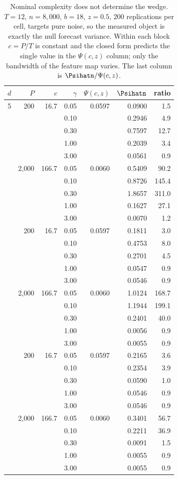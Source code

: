 \begin{table}[htbp]
\centering
\caption{Nominal complexity does not determine the wedge. $T=12$, $n=8{,}000$, $b=18$, $z=0.5$, $200$ replications per cell, targets pure noise, so the measured object is exactly the null forecast variance. Within each block $c=P/T$ is constant and the closed form predicts the single value in the $\Psi(c,z)$ column; only the bandwidth of the feature map varies. The last column is $\Psihatn/\Psi(c,z)$.}
\label{tab:mc-features}
\small
\begin{tabular}{rrrrrrr}
\toprule
$d$ & $P$ & $c$ & $\gamma$ & $\Psi(c,z)$ & $\Psihatn$ & ratio \\
\midrule
5 & 200 & 16.7 & 0.05 & 0.0597 & 0.0900 & 1.5 \\
 &  &  & 0.10 &  & 0.2946 & 4.9 \\
 &  &  & 0.30 &  & 0.7597 & 12.7 \\
 &  &  & 1.00 &  & 0.2039 & 3.4 \\
 &  &  & 3.00 &  & 0.0561 & 0.9 \\
\addlinespace
5 & 2,000 & 166.7 & 0.05 & 0.0060 & 0.5409 & 90.2 \\
 &  &  & 0.10 &  & 0.8726 & 145.4 \\
 &  &  & 0.30 &  & 1.8657 & 311.0 \\
 &  &  & 1.00 &  & 0.1627 & 27.1 \\
 &  &  & 3.00 &  & 0.0070 & 1.2 \\
\addlinespace
15 & 200 & 16.7 & 0.05 & 0.0597 & 0.1811 & 3.0 \\
 &  &  & 0.10 &  & 0.4753 & 8.0 \\
 &  &  & 0.30 &  & 0.2701 & 4.5 \\
 &  &  & 1.00 &  & 0.0547 & 0.9 \\
 &  &  & 3.00 &  & 0.0546 & 0.9 \\
\addlinespace
15 & 2,000 & 166.7 & 0.05 & 0.0060 & 1.0124 & 168.7 \\
 &  &  & 0.10 &  & 1.1944 & 199.1 \\
 &  &  & 0.30 &  & 0.2401 & 40.0 \\
 &  &  & 1.00 &  & 0.0056 & 0.9 \\
 &  &  & 3.00 &  & 0.0055 & 0.9 \\
\addlinespace
50 & 200 & 16.7 & 0.05 & 0.0597 & 0.2165 & 3.6 \\
 &  &  & 0.10 &  & 0.2354 & 3.9 \\
 &  &  & 0.30 &  & 0.0590 & 1.0 \\
 &  &  & 1.00 &  & 0.0546 & 0.9 \\
 &  &  & 3.00 &  & 0.0546 & 0.9 \\
\addlinespace
50 & 2,000 & 166.7 & 0.05 & 0.0060 & 0.3401 & 56.7 \\
 &  &  & 0.10 &  & 0.2211 & 36.9 \\
 &  &  & 0.30 &  & 0.0091 & 1.5 \\
 &  &  & 1.00 &  & 0.0055 & 0.9 \\
 &  &  & 3.00 &  & 0.0055 & 0.9 \\
\bottomrule
\end{tabular}
\end{table}
